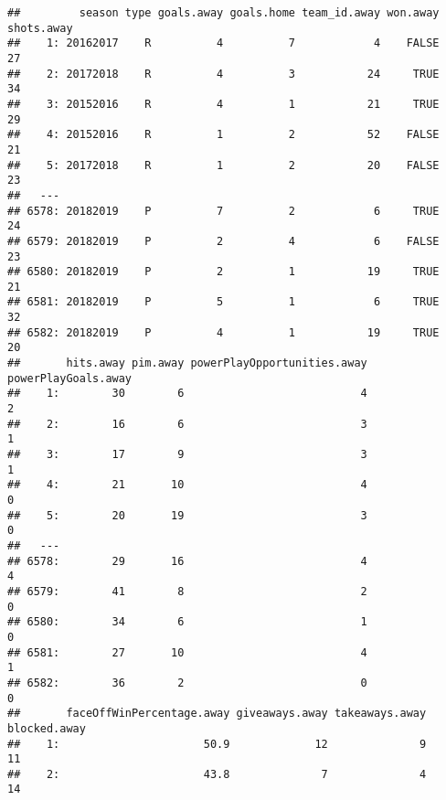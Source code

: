\documentclass[
]{article}
\newenvironment{Shaded}{\begin{snugshade}}{\end{snugshade}}
\newcommand{\DecValTok}[1]{\textcolor[rgb]{0.00,0.00,0.81}{#1}}
\newcommand{\FunctionTok}[1]{\textcolor[rgb]{0.00,0.00,0.00}{#1}}
\newcommand{\NormalTok}[1]{#1}
\newcommand{\OtherTok}[1]{\textcolor[rgb]{0.56,0.35,0.01}{#1}}
\newcommand{\SpecialCharTok}[1]{\textcolor[rgb]{0.00,0.00,0.00}{#1}}
\begin{document}
\begin{Shaded}
\end{Shaded}

\begin{verbatim}
##         season type goals.away goals.home team_id.away won.away shots.away
##    1: 20162017    R          4          7            4    FALSE         27
##    2: 20172018    R          4          3           24     TRUE         34
##    3: 20152016    R          4          1           21     TRUE         29
##    4: 20152016    R          1          2           52    FALSE         21
##    5: 20172018    R          1          2           20    FALSE         23
##   ---                                                                     
## 6578: 20182019    P          7          2            6     TRUE         24
## 6579: 20182019    P          2          4            6    FALSE         23
## 6580: 20182019    P          2          1           19     TRUE         21
## 6581: 20182019    P          5          1            6     TRUE         32
## 6582: 20182019    P          4          1           19     TRUE         20
##       hits.away pim.away powerPlayOpportunities.away powerPlayGoals.away
##    1:        30        6                           4                   2
##    2:        16        6                           3                   1
##    3:        17        9                           3                   1
##    4:        21       10                           4                   0
##    5:        20       19                           3                   0
##   ---                                                                   
## 6578:        29       16                           4                   4
## 6579:        41        8                           2                   0
## 6580:        34        6                           1                   0
## 6581:        27       10                           4                   1
## 6582:        36        2                           0                   0
##       faceOffWinPercentage.away giveaways.away takeaways.away blocked.away
##    1:                      50.9             12              9           11
##    2:                      43.8              7              4           14

\end{verbatim}
\end{document}
